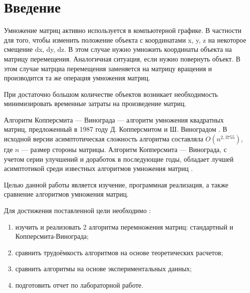 \chapter*{Введение}

Умножение матриц активно используется в компьютерной графике. В частности для того, чтобы изменить положение объекта с координатами x, y, z на некоторое смещение dx, dy, dz. В этом случае нужно умножить координаты объекта на матрицу перемещения. Аналогичная ситуация, если нужно повернуть объект. В этом случае матрциа перемещения заменяется на матрицу вращения и производится та же операция умножения матриц.   

При достаточно большом количестве объектов возникает необходимость минимизировать временные затраты на произведение матриц.

Алгоритм Копперсмита — Винограда — алгоритм умножения квадратных матриц, предложенный в 1987 году Д. Копперсмитом и Ш. Виноградом \cite{Coppersmith}.
В исходной версии асимптотическая сложность алгоритма составляла $O(n^{2,3755})$, где  $n$ — размер стороны матрицы.
Алгоритм Копперсмита — Винограда, с учетом серии улучшений и доработок в последующие годы, обладает лучшей асимптотикой среди известных алгоритмов умножения матриц \cite{Cohn}.

Целью данной работы является изучение, программная реализация, а также сравнение алгоритмов умножения матриц.


Для достижения поставленной цели необходимо :

\begin{enumerate}
	\item изучить и реализовать 2 алгоритма перемножения матриц: стандартный и Копперсмита-Винограда;
	\item сравнить трудоёмкость алгоритмов на основе теоретических расчетов;
	\item сравнить алгоритмы на основе экспериментальных данных;
    \item подготовить отчет по лабораторной работе.
\end{enumerate}

